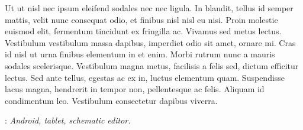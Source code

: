 {	Ut ut nisl nec ipsum eleifend sodales nec nec ligula. In blandit, tellus id semper mattis, velit nunc consequat odio, et finibus nisl nisl eu nisi. Proin molestie euismod elit, fermentum tincidunt ex fringilla ac. Vivamus sed metus lectus. Vestibulum vestibulum massa dapibus, imperdiet odio sit amet, ornare mi. Cras id nisl ut urna finibus elementum in et enim. Morbi rutrum nunc a mauris sodales scelerisque. Vestibulum magna metus, facilisis a felis sed, dictum efficitur lectus. Sed ante tellus, egestas ac ex in, luctus elementum quam. Suspendisse lacus magna, hendrerit in tempor non, pellentesque ac felis. Aliquam id condimentum leo. Vestibulum consectetur dapibus viverra. 
    }
    \vspace*{1\baselineskip}

    : {\itshape Android, tablet, schematic editor.}
    
    

    \newpage
